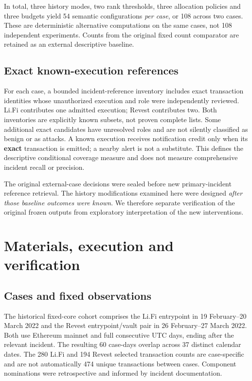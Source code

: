 \documentclass[preprint,12pt,authoryear]{elsarticle}
\begin{document}
In total, three history modes, two rank thresholds, three allocation policies and three budgets yield 54 semantic configurations \emph{per case}, or 108 across two cases. These are deterministic alternative computations on the same cases, not 108 independent experiments. Counts from the original fixed count comparator are retained as an external descriptive baseline.

\subsection{Exact known-execution references}\label{exact-known-execution-references}

For each case, a bounded incident-reference inventory includes exact transaction identities whose unauthorized execution and role were independently reviewed. Li.Fi contributes one admitted execution; Revest contributes two. Both inventories are explicitly known subsets, not proven complete lists. Some additional exact candidates have unresolved roles and are not silently classified as benign or as attacks. A known execution receives notification credit only when its \textbf{exact} transaction is emitted; a nearby alert is not a substitute. This defines the descriptive conditional coverage measure and does not measure comprehensive incident recall or precision.

The original external-case decisions were sealed before new primary-incident reference retrieval. The history modifications examined here were designed \emph{after those baseline outcomes were known}. We therefore separate verification of the original frozen outputs from exploratory interpretation of the new interventions.

\section{Materials, execution and verification}\label{materials-execution-and-verification}

\subsection{Cases and fixed observations}\label{cases-and-fixed-observations}

The historical fixed-core cohort comprises the Li.Fi entrypoint in 19 February--20 March 2022 and the Revest entrypoint/vault pair in 26 February--27 March 2022. Both use Ethereum mainnet and full consecutive UTC days, ending after the relevant incident. The resulting 60 case-days overlap across 37 distinct calendar dates. The 280 Li.Fi and 194 Revest selected transaction counts are case-specific and are not automatically 474 unique transactions between cases. Component nominations were retrospective and informed by incident documentation.
\end{document}
